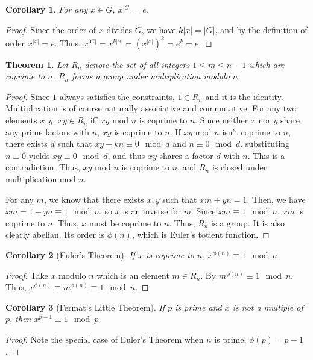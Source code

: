 \documentclass{article}
\newtheorem{theorem}{Theorem}[section]
\newtheorem{corollary}{Corollary}[theorem]
\begin{document}
\begin{corollary}
    \label{thm:x^|G|=e}
    For any $x \in G$, $x^{|G|} = e$.
\end{corollary}
\begin{proof}
    Since the order of $x$ divides $G$, we have $k|x| = |G|$,
    and by the definition of order $x^{|x|} = e$.
    Thus, $x^{|G|} = x^{k|x|} = (x^{|x|})^{k} = e^{k} = e$.
\end{proof}

\begin{theorem}
    Let $R_n$ denote the set of all integers $1 \le m \le n - 1$ which are coprime to $n$.
    $R_n$ forms a group under multiplication modulo $n$.
\end{theorem}
\begin{proof}
    Since $1$ always satisfies the constraints, $1 \in R_n$ and it is the identity.
    Multiplication is of course naturally associative and commutative.
    For any two elements $x,y$, $xy \in R_n$ iff $xy$ mod $n$ is coprime to $n$.
    Since neither $x$ nor $y$ share any prime factors with $n$, $xy$ is coprime to $n$.
    If $xy$ mod $n$ isn't coprime to $n$, there exists $d$ such that $xy - kn \equiv 0 \mod d$ and $n \equiv 0 \mod d$.
    substituting $n \equiv 0$ yields $xy \equiv 0 \mod d$, and thus $xy$ shares a factor $d$ with $n$. This is a contradiction.
    Thus, $xy$ mod $n$ is coprime to $n$, and $R_n$ is closed under multiplication mod $n$.

    For any $m$, we know that there exists $x,y$ such that $xm + yn = 1$.
    Then, we have $xm = 1 - yn \equiv 1 \mod n$, so $x$ is an inverse for $m$.
    Since $xm \equiv 1 \mod n$, $xm$ is coprime to $n$. Thus, $x$ must be coprime to $n$.
    Thus, $R_n$ is a group. It is also clearly abelian.
    Its order is $\phi(n)$, which is Euler's totient function.
\end{proof}

\begin{corollary}[Euler's Theorem]
    If $x$ is coprime to $n$, $x^{\phi(n)} \equiv 1 \mod n$.
\end{corollary}
\begin{proof}
    Take $x$ modulo $n$ which is an element $m \in R_n$. By $m^{\phi(n)} \equiv 1 \mod n$.
    Thus, $x^{\phi(n)} \equiv m^{\phi(n)} \equiv 1 \mod n$.
\end{proof}

\begin{corollary}[Fermat's Little Theorem]
    If $p$ is prime and $x$ is not a multiple of $p$, then
    $x^{p-1} \equiv 1 \mod p$
\end{corollary}
\begin{proof}
    Note the special case of Euler's Theorem when $n$ is prime, $\phi(p) = p - 1$.
\end{proof}
\end{document}
